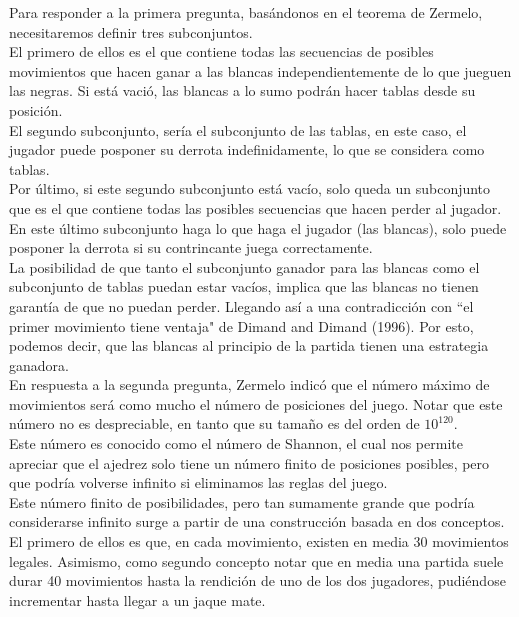 \documentclass[10pt,a4paper]{book}
\begin{document}
Para responder a la primera pregunta, basándonos en el teorema de Zermelo, necesitaremos definir tres subconjuntos.\\

El primero de ellos es el que contiene todas las secuencias de posibles movimientos que hacen ganar a las blancas independientemente de lo que jueguen las negras. Si está vació, las blancas a lo sumo podrán hacer tablas desde su posición.\\

El segundo subconjunto, sería el subconjunto de las tablas, en este caso, el jugador puede posponer su derrota indefinidamente, lo que se considera como tablas.\\
Por último, si este segundo subconjunto está vacío, solo queda un subconjunto que es el que contiene todas las posibles secuencias que hacen perder al jugador. En este último subconjunto haga lo que haga el jugador (las blancas), solo puede posponer la derrota si su contrincante juega correctamente. \\

La posibilidad de que tanto el subconjunto ganador para las blancas como el subconjunto de tablas puedan estar vacíos, implica que las blancas no tienen garantía de que no puedan perder. Llegando así a una contradicción con “el primer movimiento tiene ventaja" de Dimand and Dimand (1996). Por esto, podemos decir, que las blancas al principio de la partida tienen una estrategia ganadora. \\

En respuesta a la segunda pregunta, Zermelo indicó que el número máximo de movimientos será como mucho el número de posiciones del juego. Notar que este número no es despreciable, en tanto que su tamaño es del orden de $10^{120}$.\\

Este número es conocido como el número de Shannon, el cual nos permite apreciar que el ajedrez solo tiene un número finito de posiciones posibles, pero que podría volverse infinito si eliminamos las reglas del juego.\\

Este número finito de posibilidades, pero tan sumamente grande que podría considerarse infinito surge a partir de una construcción basada en dos conceptos. El primero de ellos es que, en cada movimiento, existen en media 30 movimientos legales. Asimismo, como segundo concepto notar que en media una partida suele durar 40 movimientos hasta la rendición de uno de los dos jugadores, pudiéndose incrementar hasta llegar a un jaque mate. \\
\end{document}
